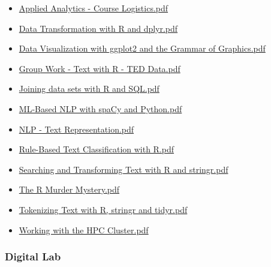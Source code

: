 \documentclass[
  letterpaper,
  DIV=11]{scrartcl}
\providecommand{\tightlist}{%
  \setlength{\itemsep}{0pt}\setlength{\parskip}{0pt}}\usepackage{longtable,booktabs,array}
\begin{document}
\begin{itemize}
\tightlist
\item
  \href{google_slides/applied_analytics/Applied\%20Analytics\%20-\%20Course\%20Logistics.pdf}{Applied
  Analytics - Course Logistics.pdf}
\item
  \href{google_slides/applied_analytics/Data\%20Transformation\%20with\%20R\%20and\%20dplyr.pdf}{Data
  Transformation with R and dplyr.pdf}
\item
  \href{google_slides/applied_analytics/Data\%20Visualization\%20with\%20ggplot2\%20and\%20the\%20Grammar\%20of\%20Graphics.pdf}{Data
  Visualization with ggplot2 and the Grammar of Graphics.pdf}
\item
  \href{google_slides/applied_analytics/Group\%20Work\%20-\%20Text\%20with\%20R\%20-\%20TED\%20Data.pdf}{Group
  Work - Text with R - TED Data.pdf}
\item
  \href{google_slides/applied_analytics/Joining\%20data\%20sets\%20with\%20R\%20and\%20SQL.pdf}{Joining
  data sets with R and SQL.pdf}
\item
  \href{google_slides/applied_analytics/ML-Based\%20NLP\%20with\%20spaCy\%20and\%20Python.pdf}{ML-Based
  NLP with spaCy and Python.pdf}
\item
  \href{google_slides/applied_analytics/NLP\%20-\%20Text\%20Representation.pdf}{NLP
  - Text Representation.pdf}
\item
  \href{google_slides/applied_analytics/Rule-Based\%20Text\%20Classification\%20with\%20R.pdf}{Rule-Based
  Text Classification with R.pdf}
\item
  \href{google_slides/applied_analytics/Searching\%20and\%20Transforming\%20Text\%20with\%20R\%20and\%20stringr.pdf}{Searching
  and Transforming Text with R and stringr.pdf}
\item
  \href{google_slides/applied_analytics/The\%20R\%20Murder\%20Mystery.pdf}{The
  R Murder Mystery.pdf}
\item
  \href{google_slides/applied_analytics/Tokenizing\%20Text\%20with\%20R,\%20stringr\%20and\%20tidyr.pdf}{Tokenizing
  Text with R, stringr and tidyr.pdf}
\item
  \href{google_slides/applied_analytics/Working\%20with\%20the\%20HPC\%20Cluster.pdf}{Working
  with the HPC Cluster.pdf}
\end{itemize}

\subsubsection{Digital Lab}\label{digital-lab}
\end{document}
